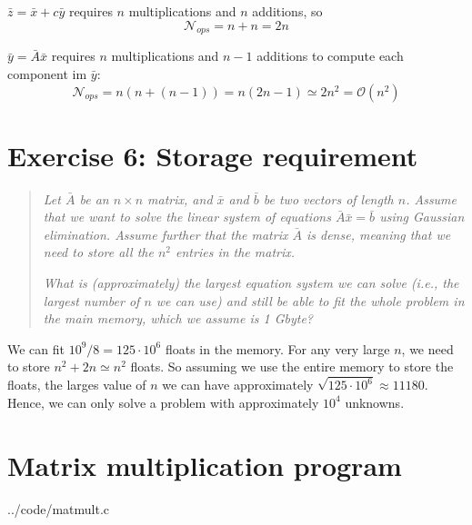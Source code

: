 $\bar{z} = \bar{x} + c \bar{y}$ requires $n$ multiplications and $n$ additions, so 
\begin{equation}
  \mathcal{N}_{ops} = n + n = 2n
\end{equation}

$\bar{y} = \bar{A}\bar{x}$ requires $n$ multiplications and $n-1$ additions to compute each component im $\bar{y}$:
\begin{equation}
  \mathcal{N}_{ops} = n(n+(n-1)) = n(2n-1) \simeq 2n^2 = \mathcal{O}(n^2)
\end{equation}


\section{Exercise 6: Storage requirement} %
\label{sec:exercise_6_storage_requirement}
\begin{quotation}
  \emph{ Let $\bar{A}$ be an $n \times n$ matrix, and $\bar{x}$ and $\bar{b}$ be two vectors of length $n$. Assume that we want to solve the linear system of equations $\bar{A} \bar{x} = \bar{b}$ using Gaussian elimination. Assume further that the matrix $\bar{A}$ is dense, meaning that we need to store all the $n^2$ entries in the matrix. }

  \emph{What is (approximately) the largest equation system we can solve (i.e., the largest number of $n$ we can use) and still be able to fit the whole problem in the main memory, which we assume is 1 Gbyte?}
\end{quotation}

We can fit $10^9 / 8 = 125 \cdot 10^6$ floats in the memory. For any very large $n$, we need to store $n^2+2n \simeq n^2$ floats. So assuming we use the entire memory to store the floats, the larges value of $n$ we can have approximately $\sqrt{125\cdot 10^6} \approx 11180$. Hence, we can only solve a problem with approximately $10^4$ unknowns.



\section{Matrix multiplication program} %
\label{sec:matrix_multiplication_program}

  {../code/matmult.c}

